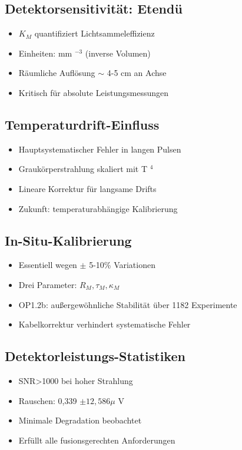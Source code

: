 \documentclass[11pt,a4paper]{article}
\begin{document}
\subsection{Detektorsensitivität: Etendü}

\begin{itemize}
\item $ K_M $ quantifiziert Lichtsammeleffizienz
\item Einheiten: mm $ ^{-3} $ (inverse Volumen)
\item Räumliche Auflösung $\sim $ 4-5 cm an Achse
\item Kritisch für absolute Leistungsmessungen
\end{itemize}

\subsection{Temperaturdrift-Einfluss}

\begin{itemize}
\item Hauptsystematischer Fehler in langen Pulsen
\item Graukörperstrahlung skaliert mit T $ ^4 $
\item Lineare Korrektur für langsame Drifts
\item Zukunft: temperaturabhängige Kalibrierung
\end{itemize}

\subsection{In-Situ-Kalibrierung}

\begin{itemize}
\item Essentiell wegen $\pm $ 5-10\% Variationen
\item Drei Parameter: $ R_M , \tau_M , \kappa_M $
\item OP1.2b: außergewöhnliche Stabilität über 1182 Experimente
\item Kabelkorrektur verhindert systematische Fehler
\end{itemize}

\subsection{Detektorleistungs-Statistiken}

\begin{itemize}
\item SNR>1000 bei hoher Strahlung
\item Rauschen: 0,339 $\pm 12,586 \mu $ V
\item Minimale Degradation beobachtet
\item Erfüllt alle fusionsgerechten Anforderungen
\end{itemize}
\end{document}
